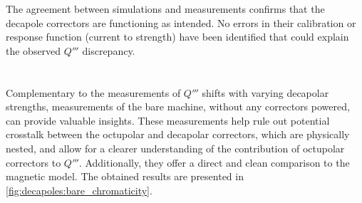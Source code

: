 The agreement between simulations and measurements confirms that the decapole correctors are
functioning as intended. No errors in their calibration or response function (current to strength)
have been identified that could explain the observed $Q'''$ discrepancy.


\section{}

Complementary to the measurements of $Q'''$ shifts with varying decapolar strengths, measurements of
the bare machine, without any correctors powered, can provide valuable insights. These measurements
help rule out potential crosstalk between the octupolar and decapolar correctors, which are
physically nested, and allow for a clearer understanding of the contribution of octupolar correctors
to $Q'''$. Additionally, they offer a direct and clean comparison to the magnetic model. The
obtained results are presented in \cref{fig:decapoles:bare_chromaticity}.

